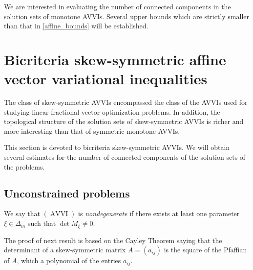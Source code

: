 \documentclass[smallextended,envcountsect]{svjour3}       %
\DeclareMathOperator{\AVVI}{AVVI}
\begin{document}
We are interested in evaluating the number of connected components in the solution sets of monotone AVVIs. Several upper bounds which are strictly smaller than that in \eqref{affine_bounds} will be established.

\section{Bicriteria skew-symmetric affine vector variational inequalities}

The class of skew-symmetric AVVIs encompassed the class of the AVVIs used  for studying  linear fractional vector optimization problems. In addition, the topological structure of the solution sets of skew-symmetric AVVIs is richer and more interesting than that of symmetric monotone AVVIs.

This section is devoted to bicriteria skew-symmetric AVVIs. We will obtain several estimates for the number of connected components of the solution sets of the problems.
\subsection{Unconstrained problems}
We say that $(\AVVI)$ is \textit{nondegenerate} if there exists at least one parameter $\xi\in\Delta_m$ such that
$\det M_{\xi}\neq 0$.

The proof of next result is based on the Cayley Theorem saying that the determinant of a skew-symmetric matrix $A=(a_{ij})$ is the square of the Pfaffian of $A$, which a polynomial of the entries $a_{ij}$.
\end{document}
